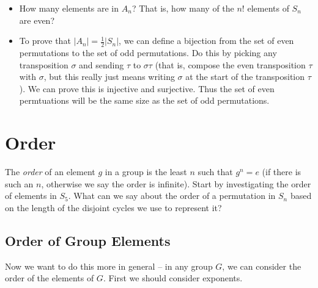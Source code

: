 \documentclass[12pt]{article}
\theoremstyle{plain}
\theoremstyle{definition}
\theoremstyle{remark}
\newcommand{\todayis}[1]{\clearpage{\rhead{\footnotesize #1}}}
\begin{document}
\begin{itemize}
  \item How many elements are in $A_n$?  That is, how many of the $n!$ elements of $S_n$ are even?  
  
  \item To prove that $|A_n| = \frac{1}{2}|S_n|$, we can define a bijection from the set of even permutations to the set of odd permutations.  Do this by picking any transposition $\sigma$ and sending $\tau$ to $\sigma\tau$ (that is, compose the even transposition $\tau$ with $\sigma$, but this really just means writing $\sigma$ at the start of the transposition $\tau$).  We can prove this is injective and surjective.  Thus the set of even permtuations will be the same size as the set of odd permutations.


\end{itemize}


\todayis{Wednesday, February 27}
\section*{Order}
The \emph{order} of an element $g$ in a group is the least $n$ such that $g^n = e$ (if there is such an $n$, otherwise we say the order is infinite).  Start by investigating the order of elements in $S_5$.  What can we say about the order of a permutation in $S_n$ based on the length of the disjoint cycles we use to represent it?

\subsection*{Order of Group Elements}

Now we want to do this more in general -- in any group $G$, we can consider the order of the elements of $G$.  First we should consider exponents.
\end{document}
